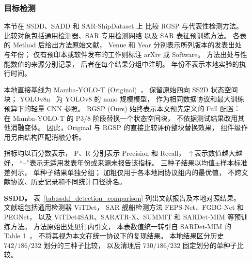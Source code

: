 
\subsubsection{目标检测}
\label{sec:detection_results}

本节在 SSDD、SADD 和 SAR-ShipDataset 上
比较 RGSP 与代表性检测方法。
比较对象包括通用检测器、SAR 专用检测网络
以及 SAR 表征预训练方法。
各表的 Method 后给出方法原始文献，
Venue 和 Year 分别表示所列版本的发表出处与年份；
仅有预印本或软件发布的工作则标注 arXiv 或 Software。
方法出处与性能数值的来源分别记录，
后者在每个结果分组中注明。
年份不表示本地实验的执行时间。

本地直接基线为 Mamba-YOLO-T (Original)~\cite{mambayolo2024}，
保留原始四向 SS2D 状态空间块；
YOLOv8n~\cite{yolov82023} 为 YOLOv8 的 nano 规模模型，
作为相同数据协议和最大训练预算下的轻量 CNN 参照。
RGSP (Ours) 始终表示本文预先定义的 Full 配置：
在 Mamba-YOLO-T 的 P3/8 阶段替换一个状态空间块，
不依据测试结果改用其他消融变体。
因此，Original 与 RGSP 的直接比较评价整块替换效果，
组件级作用另由结构匹配消融分析。

指标均以百分数表示，
P、R 分别表示 Precision 和 Recall，
$\uparrow$表示数值越大越好，
``--''表示无适用发表年份或来源未报告该指标。
三种子结果以均值$\pm$样本标准差列示，
单种子结果单独分组；
加粗仅用于各本地同协议组内的最优值，
不跨文献协议、历史记录和不同统计口径排名。

\textbf{SSDD。}
表~\ref{tab:ssdd_detection_comparison}
列出文献报告及本地对照结果。
文献组包括通用检测器 ViTDet，
SAR 舰船检测方法 FEPS-Net、FGBG-Net 和 PEGNet，
以及 ViTDet4SAR、SARATR-X、SUMMIT 和 SARDet-MIM
等预训练方法。
方法原始出处见行内引文，
本表数值统一转引自 SARDet-MIM 的 Table 1~\cite{sardetmim2026}，
不将其视为本文在统一协议下的复现结果。
本地结果区分历史 $742/186/232$ 划分的三种子比较，
以及清理后 $730/186/232$ 固定划分的单种子比较。

